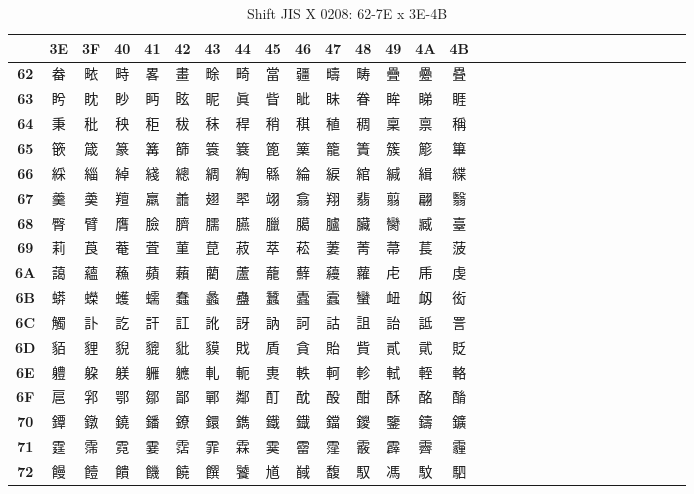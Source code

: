 \begin{table}[H]
\Fontified
\centering
\caption{Shift JIS X 0208: 62-7E x 3E-4B}
\begin{tabular}{|Sc|Sc|Sc|Sc|Sc|Sc|Sc|Sc|Sc|Sc|Sc|Sc|Sc|Sc|Sc|}
\hline
 & \textbf{3E} & \textbf{3F} & \textbf{40} & \textbf{41} & \textbf{42} & \textbf{43} & \textbf{44} & \textbf{45} & \textbf{46} & \textbf{47} & \textbf{48} & \textbf{49} & \textbf{4A} & \textbf{4B} \\ \hline
\textbf{62} & 畚 & 畩 & 畤 & 畧 & 畫 & 畭 & 畸 & 當 & 疆 & 疇 & 畴 & 疊 & 疉 & 疂 \\ \hline
\textbf{63} & 盻 & 眈 & 眇 & 眄 & 眩 & 眤 & 眞 & 眥 & 眦 & 眛 & 眷 & 眸 & 睇 & 睚 \\ \hline
\textbf{64} & 秉 & 秕 & 秧 & 秬 & 秡 & 秣 & 稈 & 稍 & 稘 & 稙 & 稠 & 稟 & 禀 & 稱 \\ \hline
\textbf{65} & 篏 & 箴 & 篆 & 篝 & 篩 & 簑 & 簔 & 篦 & 篥 & 籠 & 簀 & 簇 & 簓 & 篳 \\ \hline
\textbf{66} & 綵 & 緇 & 綽 & 綫 & 總 & 綢 & 綯 & 緜 & 綸 & 綟 & 綰 & 緘 & 緝 & 緤 \\ \hline
\textbf{67} & 羹 & 羮 & 羶 & 羸 & 譱 & 翅 & 翆 & 翊 & 翕 & 翔 & 翡 & 翦 & 翩 & 翳 \\ \hline
\textbf{68} & 臀 & 臂 & 膺 & 臉 & 臍 & 臑 & 臙 & 臘 & 臈 & 臚 & 臟 & 臠 & 臧 & 臺 \\ \hline
\textbf{69} & 莉 & 莨 & 菴 & 萓 & 菫 & 菎 & 菽 & 萃 & 菘 & 萋 & 菁 & 菷 & 萇 & 菠 \\ \hline
\textbf{6A} & 藹 & 蘊 & 蘓 & 蘋 & 藾 & 藺 & 蘆 & 蘢 & 蘚 & 蘰 & 蘿 & 虍 & 乕 & 虔 \\ \hline
\textbf{6B} & 蟒 & 蠑 & 蠖 & 蠕 & 蠢 & 蠡 & 蠱 & 蠶 & 蠹 & 蠧 & 蠻 & 衄 & 衂 & 衒 \\ \hline
\textbf{6C} & 觸 & 訃 & 訖 & 訐 & 訌 & 訛 & 訝 & 訥 & 訶 & 詁 & 詛 & 詒 & 詆 & 詈 \\ \hline
\textbf{6D} & 貊 & 貍 & 貎 & 貔 & 豼 & 貘 & 戝 & 貭 & 貪 & 貽 & 貲 & 貳 & 貮 & 貶 \\ \hline
\textbf{6E} & 軆 & 躱 & 躾 & 軅 & 軈 & 軋 & 軛 & 軣 & 軼 & 軻 & 軫 & 軾 & 輊 & 輅 \\ \hline
\textbf{6F} & 扈 & 郛 & 鄂 & 鄒 & 鄙 & 鄲 & 鄰 & 酊 & 酖 & 酘 & 酣 & 酥 & 酩 & 酳 \\ \hline
\textbf{70} & 鐔 & 鐓 & 鐃 & 鐇 & 鐐 & 鐶 & 鐫 & 鐵 & 鐡 & 鐺 & 鑁 & 鑒 & 鑄 & 鑛 \\ \hline
\textbf{71} & 霆 & 霈 & 霓 & 霎 & 霑 & 霏 & 霖 & 霙 & 霤 & 霪 & 霰 & 霹 & 霽 & 霾 \\ \hline
\textbf{72} & 饅 & 饐 & 饋 & 饑 & 饒 & 饌 & 饕 & 馗 & 馘 & 馥 & 馭 & 馮 & 馼 & 駟 \\ \hline

\end{tabular}
\end{table}
